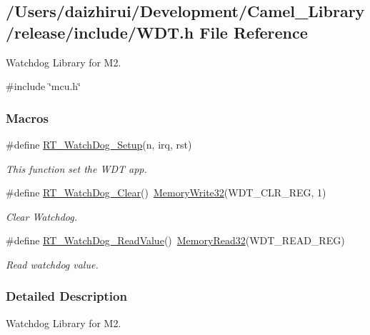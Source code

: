 \hypertarget{a00059}{}\subsection{/\+Users/daizhirui/\+Development/\+Camel\+\_\+\+Library/release/include/\+W\+DT.h File Reference}
\label{a00059}


Watchdog Library for M2.  


{\ttfamily \#include \char`\"{}mcu.\+h\char`\"{}}\newline
\subsubsection*{Macros}
\begin{DoxyCompactItemize}
\item 
\#define \mbox{\hyperlink{a00059_a369b51538a0ccf57dcdb30e12352a8c7}{R\+T\+\_\+\+Watch\+Dog\+\_\+\+Setup}}(n,  irq,  rst)
\begin{DoxyCompactList}\small\item\em This function set the W\+DT app. \end{DoxyCompactList}\item 
\#define \mbox{\hyperlink{a00059_ae976b2fe76d4b216e68a771068434abc}{R\+T\+\_\+\+Watch\+Dog\+\_\+\+Clear}}()~\mbox{\hyperlink{a00020_a6b9732365b12e48ddb89fe1028b975b0}{Memory\+Write32}}(W\+D\+T\+\_\+\+C\+L\+R\+\_\+\+R\+EG, 1)
\begin{DoxyCompactList}\small\item\em Clear Watchdog. \end{DoxyCompactList}\item 
\#define \mbox{\hyperlink{a00059_acdfc8b8f0bddfd7382d49a22a92a5930}{R\+T\+\_\+\+Watch\+Dog\+\_\+\+Read\+Value}}()~\mbox{\hyperlink{a00020_a2d484dc15bdf30ee11ab3b05f31f0e16}{Memory\+Read32}}(W\+D\+T\+\_\+\+R\+E\+A\+D\+\_\+\+R\+EG)
\begin{DoxyCompactList}\small\item\em Read watchdog value. \end{DoxyCompactList}\end{DoxyCompactItemize}


\subsubsection{Detailed Description}
Watchdog Library for M2. 

